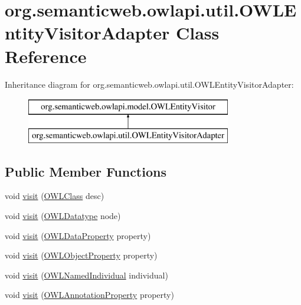 \hypertarget{classorg_1_1semanticweb_1_1owlapi_1_1util_1_1_o_w_l_entity_visitor_adapter}{\section{org.\-semanticweb.\-owlapi.\-util.\-O\-W\-L\-Entity\-Visitor\-Adapter Class Reference}
\label{classorg_1_1semanticweb_1_1owlapi_1_1util_1_1_o_w_l_entity_visitor_adapter}
}
Inheritance diagram for org.\-semanticweb.\-owlapi.\-util.\-O\-W\-L\-Entity\-Visitor\-Adapter\-:\begin{figure}[H]
\begin{center}
\leavevmode
\includegraphics[height=2.000000cm]{classorg_1_1semanticweb_1_1owlapi_1_1util_1_1_o_w_l_entity_visitor_adapter}
\end{center}
\end{figure}
\subsection*{Public Member Functions}
\begin{DoxyCompactItemize}
\item 
void \hyperlink{classorg_1_1semanticweb_1_1owlapi_1_1util_1_1_o_w_l_entity_visitor_adapter_af90d3c65130a156351cd2b084ebe3cd7}{visit} (\hyperlink{interfaceorg_1_1semanticweb_1_1owlapi_1_1model_1_1_o_w_l_class}{O\-W\-L\-Class} desc)
\item 
void \hyperlink{classorg_1_1semanticweb_1_1owlapi_1_1util_1_1_o_w_l_entity_visitor_adapter_a8d3eb5491fa95f0b643efe67cee54429}{visit} (\hyperlink{interfaceorg_1_1semanticweb_1_1owlapi_1_1model_1_1_o_w_l_datatype}{O\-W\-L\-Datatype} node)
\item 
void \hyperlink{classorg_1_1semanticweb_1_1owlapi_1_1util_1_1_o_w_l_entity_visitor_adapter_a3e3853626bc78782fba767c6482f5c2f}{visit} (\hyperlink{interfaceorg_1_1semanticweb_1_1owlapi_1_1model_1_1_o_w_l_data_property}{O\-W\-L\-Data\-Property} property)
\item 
void \hyperlink{classorg_1_1semanticweb_1_1owlapi_1_1util_1_1_o_w_l_entity_visitor_adapter_a9454c4070b3bb7dd0a4abeec4101cbe6}{visit} (\hyperlink{interfaceorg_1_1semanticweb_1_1owlapi_1_1model_1_1_o_w_l_object_property}{O\-W\-L\-Object\-Property} property)
\item 
void \hyperlink{classorg_1_1semanticweb_1_1owlapi_1_1util_1_1_o_w_l_entity_visitor_adapter_a245d1b0cfdaf7f1f33b3e5b30ad64d72}{visit} (\hyperlink{interfaceorg_1_1semanticweb_1_1owlapi_1_1model_1_1_o_w_l_named_individual}{O\-W\-L\-Named\-Individual} individual)
\item 
void \hyperlink{classorg_1_1semanticweb_1_1owlapi_1_1util_1_1_o_w_l_entity_visitor_adapter_a7768d1a4df561951d5eb2e418fc26e3c}{visit} (\hyperlink{interfaceorg_1_1semanticweb_1_1owlapi_1_1model_1_1_o_w_l_annotation_property}{O\-W\-L\-Annotation\-Property} property)
\end{DoxyCompactItemize}
